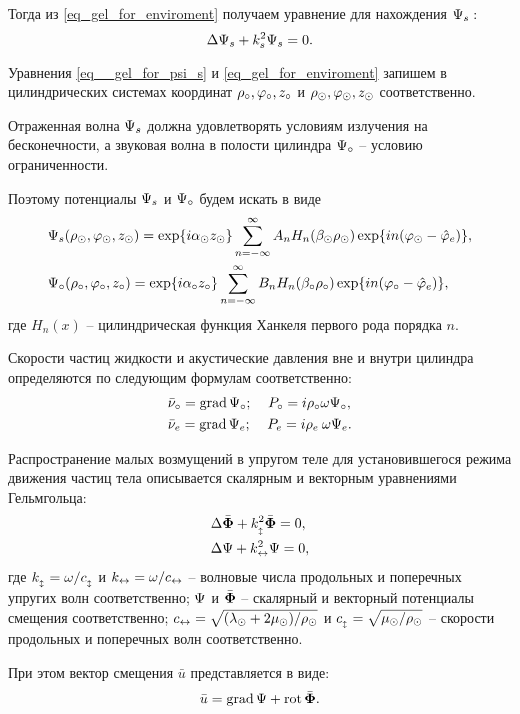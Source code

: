 Тогда из \eqref{eq_gel_for_enviroment} получаем уравнение для нахождения $\P_s:$
\begin{equation}\label{eq__gel_for_psi_s}
\Lap\P_s+k_s^2\P_s=0.
\end{equation}

Уравнения \eqref{eq__gel_for_psi_s} и \eqref{eq_gel_for_enviroment} запишем в цилиндрических системах координат $\r\c, \f\c, z\c$ и $\r\cyl, \f\cyl, z\cyl$ соответственно. 

Отраженная волна $\P_s$ должна удовлетворять условиям излучения на бесконечности, а звуковая волна в полости цилиндра $\P\c$ -- условию ограниченности.

Поэтому потенциалы $\P_s$ и $\P\c$ будем искать в виде
\begin{align}
&\P_s(\r\cyl, \f\cyl, z\cyl)= \exp\{i\alpha\cyl z\cyl\}\sum_{n=-\infty}^{\infty}A_nH_n(\beta\cyl \r\cyl)\exp\{in(\f\cyl-\hat\f\en)\},\\
&\P\c(\r\c, \f\c, z\c)= \exp\{i\alpha\c z\c\}\sum_{n=-\infty}^{\infty}B_nH_n(\beta\c \r\c)\exp\{in(\f\c-\hat\f\en)\},
\end{align}
где $H_n(x)$ -- цилиндрическая функция Ханкеля первого рода порядка $n.$

Скорости частиц жидкости и акустические давления вне и внутри цилиндра определяются по следующим формулам соответственно:
\begin{align*}
&\bar{\nu}\c=\grad\P\c;\:\:\:\:\:P\c=i\r\c\omega\P\c,\\
&\bar{\nu}\en=\grad\P\en;\:\:\:\:\:P\en=i\r\en\:\omega\P\en.
\end{align*}

Распространение малых возмущений в упругом теле для установившегося режима движения частиц тела описывается скалярным и векторным уравнениями Гельмгольца:
\begin{align}
&\Lap\bar{\F}+k_{\popr}^2\bar{\F}=0,\\
&\Lap\P+k\prodol^2\P=0,\label{fi_gel}
\end{align}
где $k_{\popr}=\omega/c_{\popr}$ и $k\prodol=\omega/c\prodol$ -- волновые числа продольных и поперечных упругих волн соответственно; $\P$ и $\bar\F$ -- скалярный и векторный потенциалы смещения соответственно; $c\prodol=\sqrt{(\lambda\cyl+2\mu\cyl)/\r\cyl}$ и $c_{\popr}=\sqrt{\mu\cyl/\r\cyl}$ -- скорости продольных и поперечных волн соответственно.

При этом вектор смещения $\bar{u}$ представляется в виде:
\begin{equation}
\bar{u}=\grad\P+\rot\bar{\F}.
\end{equation}

